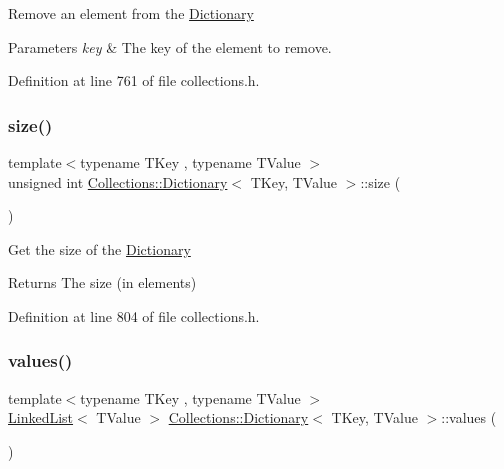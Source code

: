 Remove an element from the \hyperlink{class_collections_1_1_dictionary}{Dictionary} 
\begin{DoxyParams}{Parameters}
{\em key} & The key of the element to remove. \\
\hline
\end{DoxyParams}


Definition at line 761 of file collections.\+h.

\hypertarget{class_collections_1_1_dictionary_a7f1d63bbe511321336d9a2cd18fd9166}{}\label{class_collections_1_1_dictionary_a7f1d63bbe511321336d9a2cd18fd9166} 
\subsubsection{\texorpdfstring{size()}{size()}}
{\footnotesize\ttfamily template$<$typename T\+Key , typename T\+Value $>$ \\
unsigned int \hyperlink{class_collections_1_1_dictionary}{Collections\+::\+Dictionary}$<$ T\+Key, T\+Value $>$\+::size (\begin{DoxyParamCaption}{ }\end{DoxyParamCaption})}

Get the size of the \hyperlink{class_collections_1_1_dictionary}{Dictionary} \begin{DoxyReturn}{Returns}
The size (in elements) 
\end{DoxyReturn}


Definition at line 804 of file collections.\+h.

\hypertarget{class_collections_1_1_dictionary_a0c886eb7be8ffb9eff8ba66d901ec9e0}{}\label{class_collections_1_1_dictionary_a0c886eb7be8ffb9eff8ba66d901ec9e0} 
\subsubsection{\texorpdfstring{values()}{values()}}
{\footnotesize\ttfamily template$<$typename T\+Key , typename T\+Value $>$ \\
\hyperlink{class_collections_1_1_linked_list}{Linked\+List}$<$ T\+Value $>$ \hyperlink{class_collections_1_1_dictionary}{Collections\+::\+Dictionary}$<$ T\+Key, T\+Value $>$\+::values (\begin{DoxyParamCaption}{ }\end{DoxyParamCaption})}

